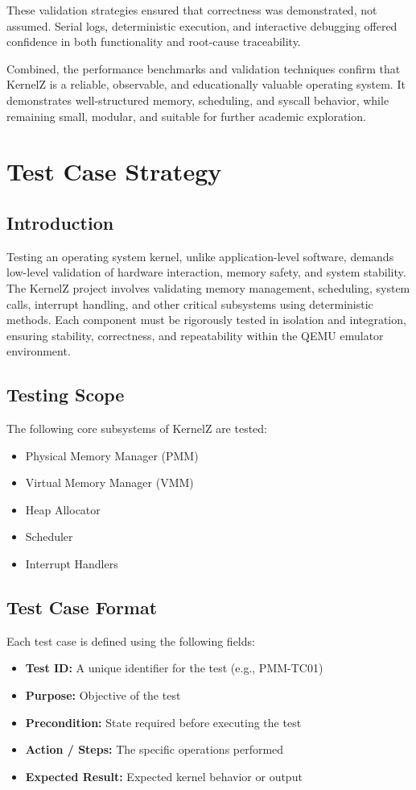\documentclass[12pt]{extarticle}
\begin{document}
These validation strategies ensured that correctness was demonstrated, not assumed. Serial logs, deterministic execution, and interactive debugging offered confidence in both functionality and root-cause traceability.

Combined, the performance benchmarks and validation techniques confirm that KernelZ is a reliable, observable, and educationally valuable operating system. It demonstrates well-structured memory, scheduling, and syscall behavior, while remaining small, modular, and suitable for further academic exploration.

\pagebreak
\section{Test Case Strategy}

\subsection{Introduction}
Testing an operating system kernel, unlike application-level software, demands low-level validation of hardware interaction, memory safety, and system stability. The KernelZ project involves validating memory management, scheduling, system calls, interrupt handling, and other critical subsystems using deterministic methods. Each component must be rigorously tested in isolation and integration, ensuring stability, correctness, and repeatability within the QEMU emulator environment.

\subsection{Testing Scope}
The following core subsystems of KernelZ are tested:
\begin{itemize}
    \item Physical Memory Manager (PMM)
    \item Virtual Memory Manager (VMM)
    \item Heap Allocator
    \item Scheduler
    \item Interrupt Handlers
\end{itemize}

\subsection{Test Case Format}
Each test case is defined using the following fields:

\begin{itemize}
    \item \textbf{Test ID:} A unique identifier for the test (e.g., PMM-TC01)
    \item \textbf{Purpose:} Objective of the test
    \item \textbf{Precondition:} State required before executing the test
    \item \textbf{Action / Steps:} The specific operations performed
    \item \textbf{Expected Result:} Expected kernel behavior or output
\end{itemize}
\end{document}
